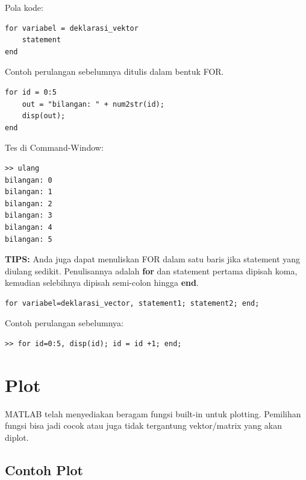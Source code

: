 \documentclass[12pt]{book}
\begin{document}
	\newpage
	Pola kode:
	\begin{verbatim}
for variabel = deklarasi_vektor
	statement
end
	\end{verbatim}

	Contoh perulangan sebelumnya ditulis dalam bentuk FOR.
	\begin{verbatim}
for id = 0:5
	out = "bilangan: " + num2str(id);
	disp(out);
end
	\end{verbatim}

	Tes di Command-Window:
	\begin{verbatim}
>> ulang
bilangan: 0
bilangan: 1
bilangan: 2
bilangan: 3
bilangan: 4
bilangan: 5
	\end{verbatim}

	\textbf{TIPS:} Anda juga dapat menuliskan FOR dalam satu baris jika statement yang diulang sedikit.
	Penulisannya adalah \textbf{for} dan statement pertama dipisah koma, kemudian selebihnya dipisah semi-colon hingga \textbf{end}.
	\begin{verbatim}
for variabel=deklarasi_vector, statement1; statement2; end;
	\end{verbatim}

	Contoh perulangan sebelumnya:
	\begin{verbatim}
>> for id=0:5, disp(id); id = id +1; end;
	\end{verbatim}

	\section{Plot}

	MATLAB telah menyediakan beragam fungsi built-in untuk plotting.
	Pemilihan fungsi bisa jadi cocok atau juga tidak tergantung vektor/matrix yang akan diplot.

	\subsection{Contoh Plot}
\end{document}
